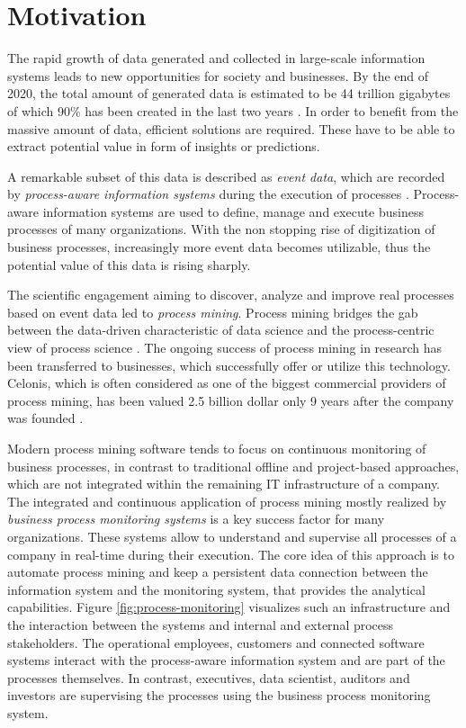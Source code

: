 
\section{Motivation}

The rapid growth of data generated and collected in large-scale information systems leads to new opportunities for  society and businesses. 
By the end of 2020, the total amount of generated data is estimated to be 44 trillion gigabytes of which 90\% has been created in the last two years \cite{datagrowth}.
In order to benefit from the massive amount of data, efficient solutions are required.
These have to be able to extract potential value in form of insights or predictions.

A remarkable subset of this data is described as \textit{event data}, which are recorded by \textit{process-aware information systems} during the execution of processes \cite{DBLP:journals/topnoc/Aalst09}.
Process-aware information systems are used to define, manage and execute business processes of many organizations.
With the non stopping rise of digitization of business processes, increasingly more event data becomes utilizable, thus the potential value of this data is rising sharply.

The scientific engagement aiming to discover, analyze and improve real processes based on event data led to \textit{process mining}. Process mining bridges the gab between the data-driven characteristic of data science and the process-centric view of process science  \cite{DBLP:books/sp/Aalst16}.
The ongoing success of process mining in research has been transferred to businesses, which successfully offer or utilize this technology.
Celonis, which is often considered as one of the biggest commercial providers of process mining, has been valued 2.5 billion dollar only 9 years after the company was founded \cite{celonis}.

Modern process mining software tends to focus on continuous monitoring of business processes, in contrast to traditional offline and project-based approaches, which are not integrated within the remaining IT infrastructure of a company.
The integrated and continuous application of process mining mostly realized by \textit{business process monitoring systems} is a key success factor for many organizations.
These systems allow to understand and supervise all processes of a company in real-time during their execution.
The core idea of this approach is to automate process mining and keep a persistent data connection between the information system and the monitoring system, that provides the analytical capabilities.
Figure \ref{fig:process-monitoring} visualizes such an infrastructure and the interaction between the systems and internal and external process stakeholders.
The operational employees, customers and connected software systems interact with the process-aware information system and are part of the processes themselves.
In contrast, executives, data scientist, auditors and investors are supervising the processes using the business process monitoring system.

